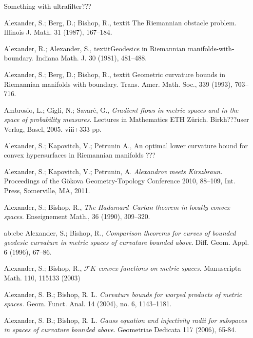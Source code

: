 \begin{thebibliography}{52}


 Something with  ultrafilter???

 Alexander, S.; Berg, D.; Bishop, R., textit{ The Riemannian obstacle problem}.
Illinois J. Math. 31 (1987), 167--184.

 Alexander, R.; Alexander, S., textit{Geodesics in Riemannian manifolds-with-boundary}.
Indiana Math. J. 30 (1981), 481--488.

 Alexander, S.; Berg, D.; Bishop, R., textit{ Geometric curvature bounds in Riemannian manifolds with
  boundary}.
  Trans. Amer. Math. Soc., 339 (1993), 703--716.

 Ambrosio, L.; Gigli, N.; Savar\'e, G., \textit{Gradient flows in metric spaces and in the space of probability measures.} Lectures in Mathematics ETH Z\"urich. Birkh???user Verlag, Basel, 2005. viii+333 pp.

 Alexander, S.; Kapovitch, V.; Petrunin A., An optimal lower curvature bound for convex hypersurfaces in Riemannian manifolds ???

Alexander, S.; Kapovitch, V.; Petrunin, A.
\textit{Alexandrov meets Kirszbraun.} Proceedings of the G\"okova Geometry-Topology Conference 2010, 88--109, Int. Press, Somerville, MA, 2011. 

Alexander, S.; Bishop, R., \textit{The Hadamard--Cartan theorem in locally convex spaces}. Enseignement Math., 36 (1990), 309--320.

\bibitem
{ab:cbc} Alexander, S.; Bishop, R., \textit{Comparison theorems for curves of bounded geodesic curvature
  in metric spaces of curvature bounded above}.
Diff. Geom. Appl. 6 (1996), 67--86.

 Alexander, S.; Bishop, R., \textit{$\mathcal F
K$-convex functions on metric spaces.} Manuscripta Math. 110, 115133 (2003)


 Alexander, S. B.; Bishop, R. L. \textit{Curvature bounds for warped products of metric spaces.}  Geom. Funct. Anal.  14  (2004),  no. 6, 1143--1181.

Alexander, S. B.; Bishop, R. L. \textit{Gauss equation and injectivity radii for subspaces in spaces of curvature bounded above.}  Geometriae Dedicata 117 (2006), 65-84.


\end{thebibliography}
